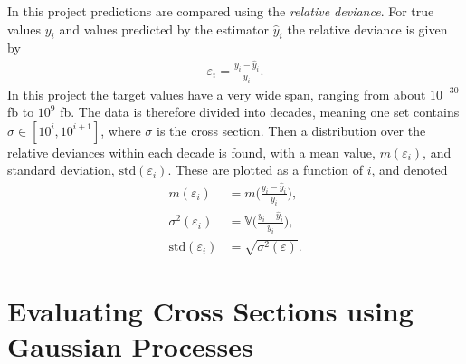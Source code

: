 \documentclass[twoside,english]{uiofysmaster}
\makeatletter
\newenvironment{chapquote}[2][2em]
  {\setlength{\@tempdima}{#1}%
   \def\chapquote@author{#2}%
   \parshape 1 \@tempdima \dimexpr\textwidth-2\@tempdima\relax%
   \itshape}
  {\par\normalfont\hfill--\ \chapquote@author\hspace*{\@tempdima}\par\bigskip}
\makeatother
\begin{document}
{In this project predictions are compared using the \textit{relative deviance}. For true values $y_i$ and values predicted by the estimator $\hat{y}_i$ the relative deviance is given by
\begin{align}\label{Eq:: gaussian process : Relative deviance}
\varepsilon_i = \frac{y_i - \hat{y}_i}{y_i}.
\end{align} 
In this project the target values have a very wide span, ranging from about $10^{-30}$ fb to $10^9$ fb. The data is therefore divided into decades, meaning one set contains $\sigma \in [10^i, 10^{i+1}]$, where $\sigma$ is the cross section. Then a distribution over the relative deviances within each decade is found, with a mean value, $m(\varepsilon_i)$, and standard deviation, $\mathrm{std}(\varepsilon_i)$. These are plotted as a function of $i$, and denoted
\begin{align}
m(\varepsilon_i) &= m \Big(\frac{y_i - \hat{y}_i}{y_i}\Big),\label{Eq:: gaussian process : rel deviance mean} \\
\sigma^2 (\varepsilon_i) &= \mathbb{V} \Big(\frac{y_i - \hat{y}_i}{y_i}\Big),\label{Eq:: gaussian process : rel deviance variance}\\
\mathrm{std}(\varepsilon_i) &= \sqrt{\sigma^2(\varepsilon)}.
\end{align} 







\chapter{Evaluating Cross Sections using Gaussian Processes}\label{Chapter:Evaluating Cross Sections using Gaussian Processes}



}
\end{document}
